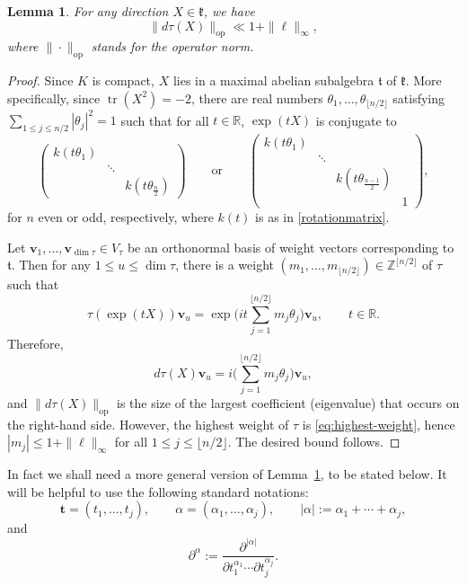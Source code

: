 \documentclass[11pt,oneside]{amsart}
\numberwithin{equation}{section}
\theoremstyle{remark}
\theoremstyle{plain}
\newtheorem{lemma}{Lemma}
\DeclareMathOperator{\tr}{tr}
\newcommand\ZZ{\mathbb{Z}}
\newcommand\RR{\mathbb{R}}
\newcommand\mfk{\mathfrak{k}}
\newcommand\mft{\mathfrak{t}}
\newcommand{\bt}{\mathbf{t}}
\newcommand{\bv}{\mathbf{v}}
\renewcommand\leq{\leqslant}
\begin{document}
\begin{lemma}\label{lemma:matrix-coefficients-derivatives} For any direction $X\in\mfk$, we have
\[
\|d\tau(X) \|_{\mathrm{op}} \ll 1+\|\bm\ell\|_{\infty},
\]
where $\|\cdot\|_{\mathrm{op}}$ stands for the operator norm.
\end{lemma}
\begin{proof} Since $K$ is compact, $X$ lies in a maximal abelian subalgebra $\mft$ of $\mfk$. More specifically, since $\tr(X^2)=-2$, there are real numbers $\theta_1,\dotsc,
\theta_{\lfloor n/2 \rfloor}$ satisfying $\sum_{1\leq j\leq n/2}|\theta_j|^2=1$ such that for all $t\in\RR$, $\exp(tX)$ is conjugate to
\[
\begin{pmatrix}
k(t\theta_1) & & \\ & \ddots & \\ & & k(t\theta_{\frac{n}{2}})
\end{pmatrix}
\qquad \text{or} \qquad
\begin{pmatrix}
k(t\theta_1) & & & \\ & \ddots & & \\ & & k(t\theta_{\frac{n-1}{2}}) & \\ & & & 1
\end{pmatrix},
\]
for $n$ even or odd, respectively, where $k(t)$ is as in \eqref{rotationmatrix}.

Let $\bv_1,\dotsc,\bv_{\dim \tau}\in V_{\tau}$ be an orthonormal basis of weight vectors corresponding to $\mft$.
Then for any $1\leq u\leq \dim\tau$, there is a weight $(m_1,\dotsc,m_{\lfloor n/2 \rfloor})\in\ZZ^{\lfloor n/2 \rfloor}$ of $\tau$ such that
\[
\tau(\exp(tX)) \bv_u = \exp\Bigg(it\sum_{j=1}^{\lfloor n/2 \rfloor} m_j \theta_j \Bigg) \bv_u,\qquad t\in\RR.
\]
Therefore,
\[d\tau(X) \bv_u = i\Bigg(\sum_{j=1}^{\lfloor n/2 \rfloor} m_j \theta_j \Bigg) \bv_u,\]
and $\|d\tau(X)\|_{\mathrm{op}}$ is the size of the largest coefficient (eigenvalue) that occurs on the right-hand side. However, the
highest weight of $\tau$ is \eqref{eq:highest-weight}, hence $|m_j|\leq 1+\|\bm\ell\|_{\infty}$ for all $1\leq j\leq \lfloor n/2 \rfloor$. The desired bound follows.
\end{proof}
In fact we shall need a more general version of Lemma~\ref{lemma:matrix-coefficients-derivatives}, to be stated below. It will be helpful to use the following standard notations:
\[\bt = (t_1, \dotsc, t_j),\qquad \alpha=(\alpha_1,\dotsc,\alpha_j), \qquad |\alpha|:=\alpha_1+\dotsb+\alpha_j,\]
and
\[
\partial^{\alpha}:=\frac{\partial^{|\alpha|}}{\partial t_1^{\alpha_1}\dotsb \partial t_j^{\alpha_j}}.
\]
\end{document}
